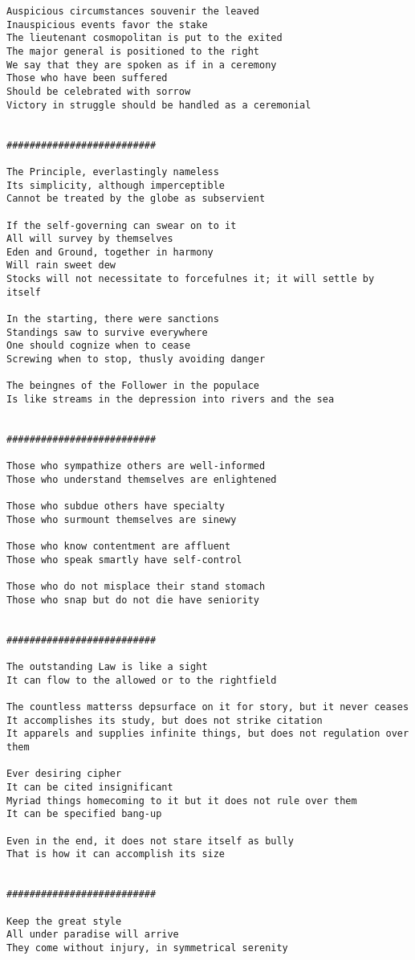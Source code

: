 \documentclass[12pt,a4paper,oneside]{book}
\begin{document}
\begin{verbatim}
Auspicious circumstances souvenir the leaved
Inauspicious events favor the stake
The lieutenant cosmopolitan is put to the exited
The major general is positioned to the right
We say that they are spoken as if in a ceremony
Those who have been suffered
Should be celebrated with sorrow
Victory in struggle should be handled as a ceremonial


##########################

The Principle, everlastingly nameless
Its simplicity, although imperceptible
Cannot be treated by the globe as subservient

If the self-governing can swear on to it
All will survey by themselves
Eden and Ground, together in harmony
Will rain sweet dew
Stocks will not necessitate to forcefulnes it; it will settle by itself

In the starting, there were sanctions
Standings saw to survive everywhere
One should cognize when to cease
Screwing when to stop, thusly avoiding danger

The beingnes of the Follower in the populace
Is like streams in the depression into rivers and the sea


##########################

Those who sympathize others are well-informed
Those who understand themselves are enlightened

Those who subdue others have specialty
Those who surmount themselves are sinewy

Those who know contentment are affluent
Those who speak smartly have self-control

Those who do not misplace their stand stomach
Those who snap but do not die have seniority


##########################

The outstanding Law is like a sight
It can flow to the allowed or to the rightfield

The countless matterss depsurface on it for story, but it never ceases
It accomplishes its study, but does not strike citation
It apparels and supplies infinite things, but does not regulation over them

Ever desiring cipher
It can be cited insignificant
Myriad things homecoming to it but it does not rule over them
It can be specified bang-up

Even in the end, it does not stare itself as bully
That is how it can accomplish its size


##########################

Keep the great style
All under paradise will arrive
They come without injury, in symmetrical serenity


\end{verbatim}
\end{document}
